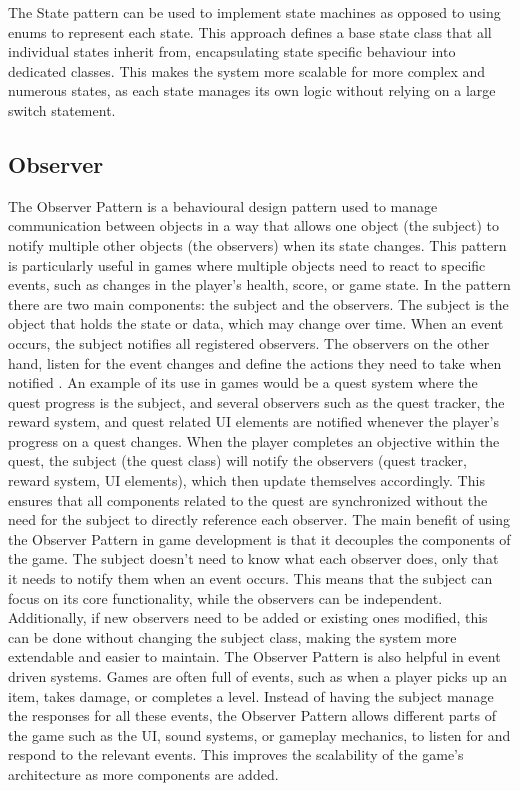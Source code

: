\documentclass[10pt]{final_report}
\begin{document}
\newline
The State pattern can be used to implement state machines as opposed to using enums to represent each state. This approach defines a base state class that all individual states inherit from, encapsulating state specific behaviour into dedicated classes. This makes the system more scalable for more complex and numerous states, as each state manages its own logic without relying on a large switch statement.  

\subsection{Observer}\label{observer}
The Observer Pattern is a behavioural design pattern used to manage communication between objects in a way that allows one object (the subject) to notify multiple other objects (the observers) when its state changes. This pattern is particularly useful in games where multiple objects need to react to specific events, such as changes in the player’s health, score, or game state. In the pattern there are two main components: the subject and the observers. The subject is the object that holds the state or data, which may change over time. When an event occurs, the subject notifies all registered observers. The observers on the other hand, listen for the event changes and define the actions they need to take when notified \cite{nystrom2011game}.
\newline
An example of its use in games would be a quest system where the quest progress is the subject, and several observers such as the quest tracker, the reward system, and quest related UI elements are notified whenever the player's progress on a quest changes. When the player completes an objective within the quest, the subject (the quest class) will notify the observers (quest tracker, reward system, UI elements), which then update themselves accordingly. This ensures that all components related to the quest are synchronized without the need for the subject to directly reference each observer.
\newline
The main benefit of using the Observer Pattern in game development is that it decouples the components of the game. The subject doesn’t need to know what each observer does, only that it needs to notify them when an event occurs. This means that the subject can focus on its core functionality, while the observers can be independent. Additionally, if new observers need to be added or existing ones modified, this can be done without changing the subject class, making the system more extendable and easier to maintain.
\newline
The Observer Pattern is also helpful in event driven systems. Games are often full of events, such as when a player picks up an item, takes damage, or completes a level. Instead of having the subject manage the responses for all these events, the Observer Pattern allows different parts of the game such as the UI, sound systems, or gameplay mechanics, to listen for and respond to the relevant events. This improves the scalability of the game’s architecture as more components are added.
\end{document}
